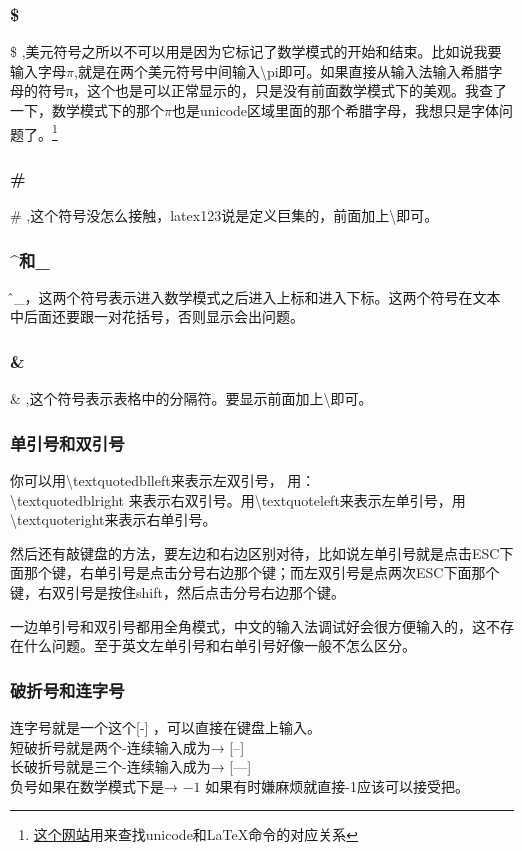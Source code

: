 \documentclass[12pt,oneside]{book}
\begin{document}
\begin{common-format}
\subsubsection{\$}
\$ ,美元符号之所以不可以用是因为它标记了数学模式的开始和结束。比如说我要输入字母$\pi$,就是在两个美元符号中间输入\textbackslash pi即可。如果直接从输入法输入希腊字母的符号π，这个也是可以正常显示的，只是没有前面数学模式下的美观。我查了一下，数学模式下的那个$\pi$也是unicode区域里面的那个希腊字母，我想只是字体问题了。\footnote{\href{http://www.johndcook.com/unicode_latex.html}{这个网站}用来查找unicode和\LaTeX 命令的对应关系}

\subsubsection{\#}
\# ,这个符号没怎么接触，latex123说是定义巨集的，前面加上\textbackslash 即可。

\subsubsection{\^{}和\_{}}
\^和\_{}，这两个符号表示进入数学模式之后进入上标和进入下标。这两个符号在文本中后面还要跟一对花括号，否则显示会出问题。

\subsubsection{\&}
\& ,这个符号表示表格中的分隔符。要显示前面加上\textbackslash 即可。

\subsubsection{单引号和双引号}
你可以用\textbackslash textquotedblleft来表示左双引号， 用：\\
\textbackslash textquotedblright 来表示右双引号。用\textbackslash textquoteleft来表示左单引号，用\textbackslash textquoteright来表示右单引号。

然后还有敲键盘的方法，要左边和右边区别对待，比如说左单引号就是点击ESC下面那个键，右单引号是点击分号右边那个键；而左双引号是点两次ESC下面那个键，右双引号是按住shift，然后点击分号右边那个键。

一边单引号和双引号都用全角模式，中文的输入法调试好会很方便输入的，这不存在什么问题。至于英文左单引号和右单引号好像一般不怎么区分。

\subsubsection{破折号和连字号}
连字号就是一个这个[-] ，可以直接在键盘上输入。\\
短破折号就是两个-连续输入成为→  [--]\\
长破折号就是三个-连续输入成为→  [---]\\
负号如果在数学模式下是→  $ -1 $  如果有时嫌麻烦就直接-1应该可以接受把。


\end{common-format}
\end{document}
